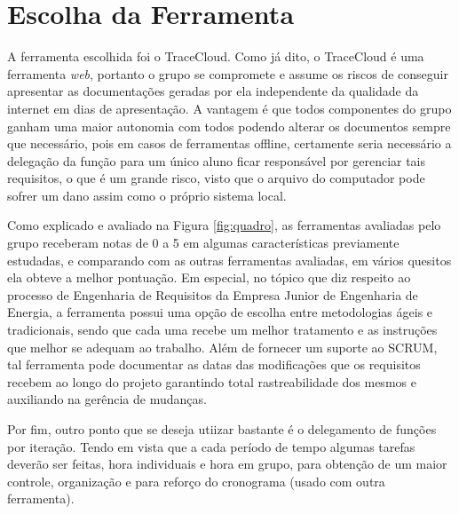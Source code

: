 \section[Escolha da Ferramenta]{Escolha da Ferramenta}
A ferramenta escolhida foi o TraceCloud. Como já dito, o TraceCloud é uma ferramenta \textit{web}, portanto o grupo se compromete e assume os riscos de conseguir apresentar as documentações geradas por ela independente da qualidade da internet em dias de apresentação. 
A vantagem é que todos componentes do grupo ganham uma maior autonomia com todos podendo alterar os documentos sempre que necessário, 
pois em casos de ferramentas offline, certamente seria necessário a delegação da função para um único aluno ficar responsável por gerenciar 
tais requisitos, o que é um grande risco, visto que o arquivo do computador pode sofrer um dano assim como o próprio sistema local.

Como explicado e avaliado na Figura \ref{fig:quadro}, as ferramentas avaliadas pelo grupo receberam notas de 0 a 5 em algumas características 
previamente estudadas, e comparando com as outras ferramentas avaliadas, em vários quesitos ela obteve a melhor pontuação. 
Em especial, no tópico que diz respeito ao processo de Engenharia de Requisitos da Empresa Junior de Engenharia de Energia, a ferramenta possui 
uma opção de escolha entre metodologias ágeis e tradicionais, sendo que cada uma recebe um melhor tratamento e as instruções que melhor se adequam 
ao trabalho. Além de fornecer um suporte ao SCRUM, tal ferramenta pode documentar as datas das modificações que os requisitos recebem ao longo do 
projeto garantindo total rastreabilidade dos mesmos e auxiliando na gerência de mudanças.

Por fim, outro ponto que se deseja utiizar bastante é o delegamento de funções por iteração. Tendo em vista que a cada período de tempo 
algumas tarefas deverão ser feitas, hora individuais e hora em grupo, para obtenção de um maior controle, organização e para reforço do 
cronograma (usado com outra ferramenta).
